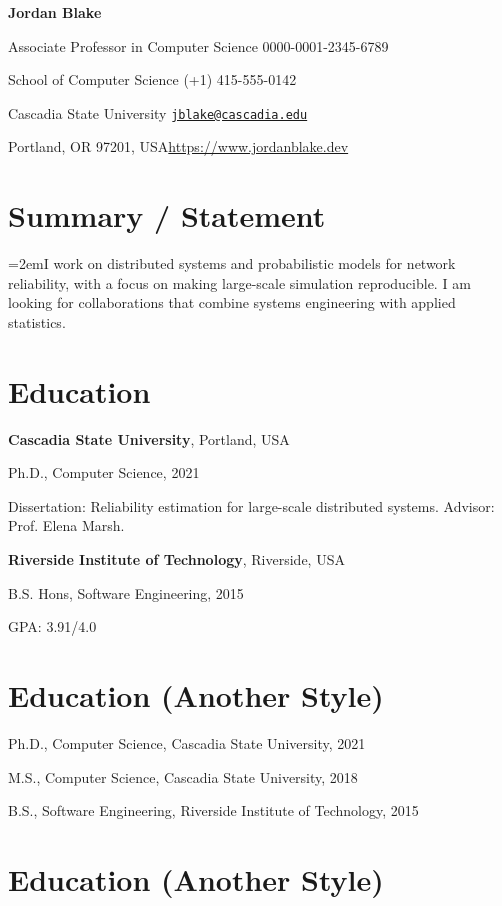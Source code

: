 \documentclass{article}
\newcommand{\cvsection}[1]{\section*{\rmfamily#1}}
\begin{document}
\begin{center}
    \Huge{
    \rmfamily
    \textbf{Jordan Blake}}
\end{center}
\vspace{20pt}

\setlength{\parskip}{3pt}

\noindent Associate Professor in Computer Science \hfill 0000-0001-2345-6789

\noindent School of Computer Science \hfill (+1) 415-555-0142

\noindent Cascadia State University \hfill \href{mailto:jblake@cascadia.edu}{\texttt{jblake@cascadia.edu}}

\noindent Portland, OR 97201, USA\hfill \url{https://www.jordanblake.dev}


\cvsection{Summary / Statement}

\hangindent=2emI work on distributed systems and probabilistic models for
network reliability, with a focus on making large-scale simulation
reproducible. I am looking for collaborations that combine systems
engineering with applied statistics.


\cvsection{Education}

\textbf{Cascadia State University}, Portland, USA

\hspace{2em}Ph.D., Computer Science, 2021

\hspace{2em}Dissertation: Reliability estimation for large-scale distributed
systems. Advisor: Prof. Elena Marsh.

\textbf{Riverside Institute of Technology}, Riverside, USA

\hspace{2em}B.S. Hons, Software Engineering, 2015

\hspace{2em}GPA: 3.91/4.0


\cvsection{Education (Another Style)}

Ph.D., Computer Science, Cascadia State University, 2021

M.S., Computer Science, Cascadia State University, 2018

B.S., Software Engineering, Riverside Institute of Technology, 2015


\cvsection{Education (Another Style)}
\end{document}
